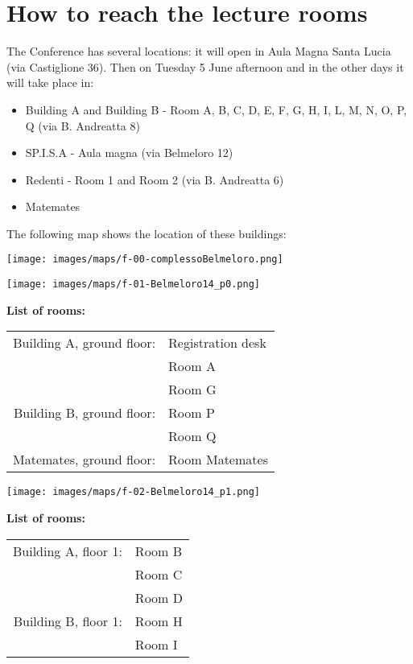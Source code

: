 \section*{How to reach the lecture rooms}
The Conference has several locations: it will open in Aula Magna Santa Lucia (via Castiglione 36).
Then on Tuesday 5 June afternoon and in the other days it will take place in:

\bigskip

\begin{itemize}
\item Building A and Building B - Room A, B, C, D, E, F, G, H, I, L, M, N, O, P, Q (via B. Andreatta 8)
\item SP.I.S.A - Aula magna (via Belmeloro 12)
\item Redenti - Room 1 and Room 2 (via B. Andreatta 6)
\item Matemates
\end{itemize}

\bigskip

\noindent The following map shows the location of these buildings:

\bigskip

\texttt{[image: images/maps/f-00-complessoBelmeloro.png]}

\newpage
\hspace*{-1cm}
\texttt{[image: images/maps/f-01-Belmeloro14\_p0.png]}
\vfill

{\large\textbf{\hfill List of rooms:}\bigskip}

\hfill\colorbox{siamblue!50}{\large
\begin{tabular}{ r l }
Building A, ground floor: & Registration desk \\
                          & Room A \\
                          & Room G \\
Building B, ground floor: & Room P \\
                          & Room Q \\
Matemates, ground floor:  & Room Matemates
\end{tabular}
}

\newpage
\hspace*{-1cm}
\texttt{[image: images/maps/f-02-Belmeloro14\_p1.png]}
\vfill

{\large\textbf{\hfill List of rooms:}\bigskip}

\hfill\colorbox{siamblue!50}{\large
\begin{tabular}{ r l }
  Building A, floor 1: & Room B \\
                       & Room C \\
                       & Room D \\
  Building B, floor 1: & Room H \\
                       & Room I
\end{tabular}
}

